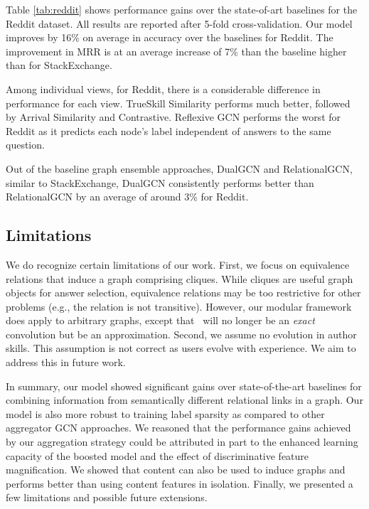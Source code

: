 Table \ref{tab:reddit} shows performance gains over the state-of-art baselines for the Reddit dataset. All results are reported after 5-fold cross-validation. Our model improves by 16\% on average in accuracy over the baselines for Reddit. The improvement in MRR is at an average increase of 7\% than the baseline higher than for StackExchange.

Among individual views, for Reddit, there is a considerable difference in performance for each view. TrueSkill Similarity performs much better, followed by Arrival Similarity and Contrastive. Reflexive GCN performs the worst for Reddit as it predicts each node's label independent of answers to the same question.

Out of the baseline graph ensemble approaches, DualGCN and RelationalGCN, similar to StackExchange, DualGCN consistently performs better than RelationalGCN by an average of around 3\% for Reddit.




\subsection{Limitations} We do recognize certain limitations of our work. First, we focus on equivalence relations that induce a graph comprising cliques. While cliques are useful graph objects for answer selection, equivalence relations may be too restrictive for other problems (e.g., the relation is not transitive). However, our modular framework does apply to arbitrary graphs, except that~ will no longer be an \emph{exact} convolution but be an approximation. Second, we assume no evolution in author skills. This assumption is not correct as users evolve with experience. We aim to address this in future work.

In summary, our model showed significant gains over state-of-the-art baselines for combining information from semantically different relational links in a graph. Our model is also more robust to training label sparsity as compared to other aggregator GCN approaches. We reasoned that the performance gains achieved by our aggregation strategy could be attributed in part to the enhanced learning capacity of the boosted model and the effect of discriminative feature magnification. We showed that content can also be used to induce graphs and performs better than using content features in isolation. Finally, we presented a few limitations and possible future extensions.
